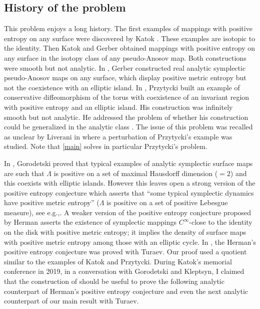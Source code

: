 \documentclass[11pt]{article}
\newcommand{\eg}{e.g.,\xspace}
\theoremstyle{definition}
\begin{document}
\subsection{History of the problem}
This problem enjoys a long history. The first exam\-ples of mappings with positive entropy on any surface were discovered by Katok \cite{Ka79}. These examples are isotopic to the identity. Then Katok and Gerber \cite{GK82} obtained mappings with positive entropy on any surface in the isotopy class of any pseudo-Anosov map. Both constructions were smooth but not analytic. In \cite{Ge85}, Gerber constructed real analytic symplectic pseudo-Anosov maps on any surface, which display positive metric entropy but not the coexistence with an elliptic \hbox{island}. In \cite{Pr82}, Przytycki built an example of conservative diffeomorphism of the torus with coexistence of an invariant region with positive entropy and an elliptic island. His construction was infinitely smooth but not analytic. He addressed the problem of whether his construction could be generalized in the analytic class \cite[Rem.\,1, p.\,461]{Pr82}. The issue of this problem was recalled as unclear by Liverani in \cite[Rem.\,2.4, p.\,3]{Li04} where a perturbation of Przytycki's example was studied. Note that \cref{main} solves in particular Przytycki's problem.

In \cite{Go12}, Gorodetski proved that typical examples of analytic symplectic surface maps are such that $\Lambda$ is positive on a set of maximal Hausdorff dimension ($= 2$) and this coexists with elliptic islands. However this leaves open a strong version of the positive entropy conjecture which asserts that ``some typical symplectic dynamics have positive metric entropy'' ($\Lambda$ is positive on a set of positive Lebesgue measure), see \eg \cite[p.\,144]{Si94}. A weaker version of the positive entropy conjecture proposed by Herman \cite{He98} asserts the existence of symplectic mappings $C^\infty$-close to the identity on the disk with positive metric entropy; it implies the density of surface maps with positive metric entropy among those with an elliptic cycle. In \cite{BT19}, the Herman's positive entropy conjecture was proved with Turaev. Our proof used a quotient similar to the examples of Katok and Przytycki. During Katok's memorial conference in 2019, in a conversation with Gorodetski and Kleptsyn, I claimed that the construction of \cite{BT19} should be useful to prove the following analytic counterpart of Herman's positive entropy conjecture \cite{He98} and even the next analytic counterpart of our main result with Turaev.
\end{document}
